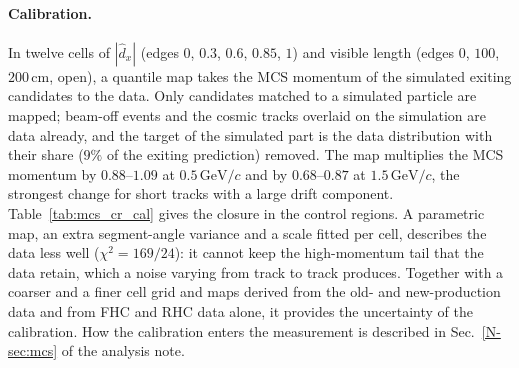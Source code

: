 \documentclass[11pt,a4paper]{article}
\newcommand{\noteref}[2]{#1~\ref{N-#2} of the analysis note}
\newcommand{\GeVc}{\,\text{GeV}\!/c}
\begin{document}
\paragraph{Calibration.} In twelve cells of $|\hat{d}_x|$ (edges $0$, $0.3$, $0.6$, $0.85$, $1$) and visible length
(edges $0$, $100$, $200\,$cm, open), a quantile map takes the MCS momentum of the simulated exiting candidates to the
data. Only candidates matched to a simulated particle are mapped; beam-off events and the cosmic tracks overlaid on
the simulation are data already, and the target of the simulated part is the data distribution with their share
($9\%$ of the exiting prediction) removed. The map multiplies the MCS momentum by $0.88$--$1.09$ at $0.5\GeVc$ and by
$0.68$--$0.87$ at $1.5\GeVc$, the strongest change for short tracks with a large drift component. Table~\ref{tab:mcs_cr_cal} gives the closure in the control
regions. A parametric map, an extra segment-angle variance and a scale fitted per cell, describes the data less well
($\chi^2=169/24$): it cannot keep the high-momentum tail that the data retain, which a noise varying from track to
track produces. Together with a coarser and a finer cell grid and maps derived from the old- and new-production data
and from FHC and RHC data alone, it provides the uncertainty of the calibration. How the calibration enters the
measurement is described in \noteref{Sec.}{sec:mcs}.
\end{document}
